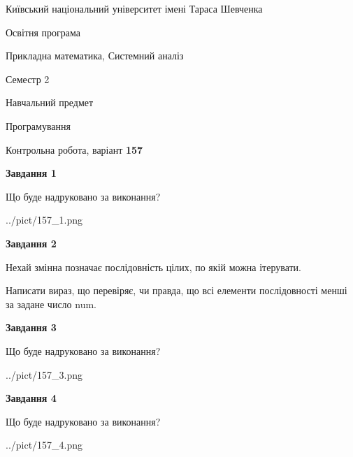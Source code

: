\documentclass[12pt, ukrainian]{article}
\begin{document}
{{\begin {small}\par
{ \center  Київський національний університет імені Тараса Шевченка \par}
{\parbox {5 cm}{Освітня програма \hfill}{\parbox {8 cm}{Прикладна математика, Системний аналіз \hfill}}\parbox {5 cm}{\hfill Семестр 2}}\par
{\parbox {5 cm} {Навчальний предмет \hfill}\parbox {7 cm}{Програмування \hfill}\parbox {6cm}{\hfill}\par}\vspace{-7pt} \end{small}}{\center Контрольна робота, варіант  \No \textbf
{ 157 }\par}}
{
\begin {large}
{\begin {center}\textbf{Завдання 1}\end {center}}\par
Що буде надруковано за виконання?\par\par
\begin{center}
	{../pict/157_1.png}
\end{center}
\newpage

{\begin {center}\textbf{Завдання 2}\end {center}}\par
Нехай змінна  позначає послідовність цілих, по якій можна ітерувати.

Написати вираз, що перевіряє, чи правда, що всі елементи послідовності менші за задане число num.\par
\newpage

{\begin {center}\textbf{Завдання 3}\end {center}}\par
Що буде надруковано за виконання?
\begin{center}
	{../pict/157_3.png}
\end{center}
\newpage

{\begin {center}\textbf{Завдання 4}\end {center}}\par
Що буде надруковано за виконання?\par
\begin{center}
	{../pict/157_4.png}
\end{center}
\newpage


\end{large}}
\end{document}
